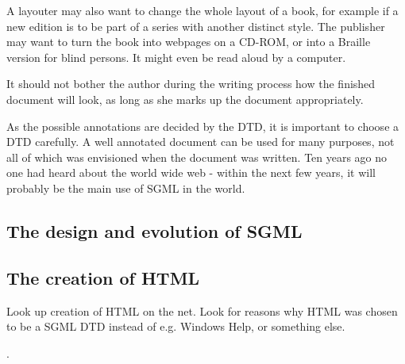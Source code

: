 A layouter may also want to change the whole layout of a book, for
example if a new edition is to be part of a series with another
distinct style.  The publisher may want to turn the book into webpages
on a CD-ROM, or into a Braille version for blind persons.  It might
even be read aloud by a computer.

It should not bother the author during the writing process how the
finished document will look, as long as she marks up the document
appropriately.

As the possible annotations are decided by the DTD, it is important to
choose a DTD carefully.  A well annotated document can be used for
many purposes, not all of which was envisioned when the document was
written.  Ten years ago no one had heard about the world wide web -
within the next few years, it will probably be the main use of SGML in
the world.



\subsection{The design and evolution of SGML}





\subsection{The \textsf{creation} of HTML}

\textsf{Look up creation of HTML on the net.  Look for reasons why HTML
  was chosen to be a SGML DTD instead of e.g. Windows Help, or
  something else}.

.



